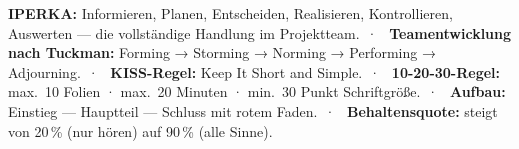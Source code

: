 \documentclass[11pt, a4paper]{article}
\begin{document}
\begin{merksatz}[title={\bfseries Zusammenfassung: Kernbegriffe dieser Session}]
\textbf{IPERKA:} Informieren, Planen, Entscheiden, Realisieren, Kontrollieren, Auswerten --- die
vollständige Handlung im Projektteam.~·~
\textbf{Teamentwicklung nach Tuckman:} Forming → Storming → Norming → Performing → Adjourning.~·~
\textbf{KISS-Regel:} Keep It Short and Simple.~·~
\textbf{10-20-30-Regel:} max.\ 10 Folien · max.\ 20 Minuten · min.\ 30 Punkt Schriftgröße.~·~
\textbf{Aufbau:} Einstieg --- Hauptteil --- Schluss mit rotem Faden.~·~
\textbf{Behaltensquote:} steigt von 20\,\% (nur hören) auf 90\,\% (alle Sinne).
\end{merksatz}
\end{document}
